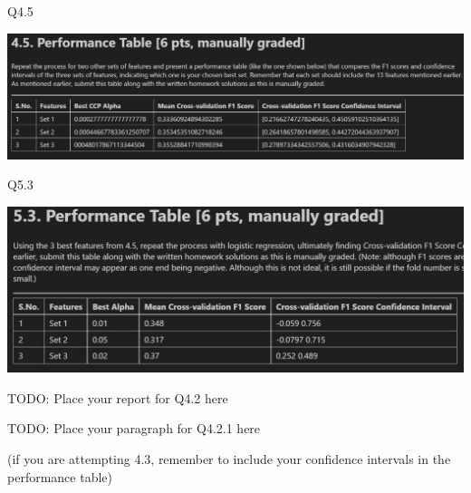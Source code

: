 \documentclass[12pt]{article}
\begin{document}
\vspace{4mm}
\noindent
Q4.5

\includegraphics{4.5.jpg}

\vspace{4mm}
\noindent
Q5.3

\includegraphics{5.3.jpg}

\vspace{4mm}
\noindent
TODO: Place your report for Q4.2 here 

\vspace{4mm}
\noindent
TODO: Place your paragraph for Q4.2.1 here 

\vspace{4mm}
\noindent
(if you are attempting 4.3, remember to include your confidence intervals in the performance table)
\end{document}
